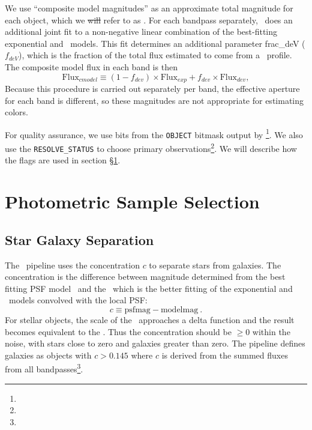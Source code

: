 \documentclass[preprint]{aastex}
\begin{document}
We use ``composite model magnitudes'' as an approximate total magnitude for
each object, which we \sout{will} refer to as \cmodelmag.  For each bandpass
separately, \photo\ does an additional joint fit to a non-negative
linear combination of the  best-fitting exponential and \devauc\
models. This fit determines an additional parameter {\sc frac\_deV}
($f_{deV}$), which is the fraction of the total flux estimated to come
from a \devauc\ profile.  The composite model flux in each band is then 
\begin{equation}
\textrm{Flux}_{cmodel} \equiv (1-f_{dev})\times \textrm{Flux}_{exp} + f_{dev} \times \textrm{Flux}_{dev},
\end{equation}
Because this procedure is carried out separately per band, the effective aperture for each band is
different, so these magnitudes are not appropriate for estimating colors.

For quality assurance, we use bits from the \texttt{OBJECT} bitmask output by
\photo \footnote{\DRateflags}.    We also use the \texttt{RESOLVE\_STATUS} to
choose primary observations\footnote{\DRateresolve}.  We will describe how the
flags are used in section \S \ref{sec:select}.

    

\section{Photometric Sample Selection} \label{sec:select}

\subsection{Star Galaxy Separation} \label{sec:sg}

The \photo\ pipeline uses the concentration $c$ to separate stars from
galaxies.  The concentration is the difference between magnitude determined
from the best fitting PSF model \psfmag\ and the \modelmag\, which is
the better fitting of the exponential and \devauc\ models convolved
with the local PSF:
\begin{equation}
c \equiv \textrm{psfmag} - \textrm{modelmag}~.
\end{equation}
For stellar objects, the scale of the \modelmag\ approaches a delta function and
the result becomes equivalent to the \psfmag.  Thus the concentration should be
$\ge 0$ within the noise, with stars close to zero and galaxies greater than
zero.  The pipeline defines galaxies as objects with $c > 0.145$ where $c$ is
derived from the summed fluxes from all bandpasses\footnote{\DRateclass}.  
\end{document}
